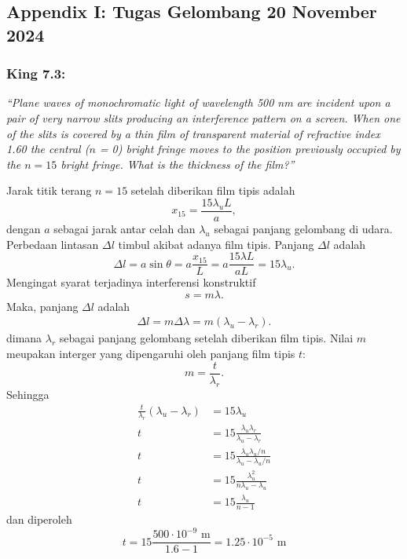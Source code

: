 \documentclass[../../../main.tex]{subfiles}
\begin{document}
\subsection*{Appendix I: Tugas Gelombang 20 November 2024}
\subsubsection*{King 7.3:} \emph{\enquote{Plane waves of monochromatic light of wavelength 500 nm are incident upon a pair of very narrow slits producing an interference pattern on a screen. When one of the slits is covered by a thin ﬁlm of transparent material of refractive index 1.60 the central ($n$ = 0) bright fringe moves to the position previously occupied by the $n = 15$ bright fringe. What is the thickness of the ﬁlm?}}

Jarak titik terang $n=15$ setelah diberikan film tipis adalah
\begin{equation*}
  x_{15}=\frac{15\lambda_u L}{a},
\end{equation*}
dengan $a$ sebagai jarak antar celah dan $\lambda_u$ sebagai panjang gelombang di udara. Perbedaan lintasan $\Delta l$ timbul akibat adanya film tipis. Panjang $\Delta l$ adalah 
\begin{equation*}
  \Delta l=a\sin\theta=a\frac{x_{15}}{L}=a\frac{15\lambda L}{aL}=15\lambda_u.
\end{equation*}
Mengingat syarat terjadinya interferensi konstruktif 
\begin{equation*}
  s=m\lambda.
\end{equation*}
Maka, panjang $\Delta l$ adalah 
\begin{align*}
  \Delta l=m\Delta \lambda=m( \lambda_u-\lambda_r).
\end{align*}
dimana $\lambda_r$ sebagai panjang gelombang setelah diberikan film tipis. Nilai $m$ meupakan interger yang dipengaruhi oleh panjang film tipis $t$:
\begin{equation*}
  m=\frac{t}{\lambda_r}.
\end{equation*}
Sehingga
\begin{align*}
  \frac{t}{\lambda_r}( \lambda_u-\lambda_r)&=15\lambda_u\\
  t&=15\frac{\lambda_u\lambda_r}{ \lambda_u-\lambda_r}\\
  t&=15\frac{\lambda_u\lambda_u/n}{ \lambda_u-\lambda_u/n}\\
  t&=15\frac{\lambda_u^2}{ n\lambda_u-\lambda_u}\\
  t&=15\frac{\lambda_u}{ n-1}
\end{align*}
dan diperoleh 
\begin{equation*}
  t=15\frac{500\cdot10^{-9} \text{ m}}{ 1.6-1}=\boxed{1.25 \cdot 10^{-5} \text{ m}}
\end{equation*}
\end{document}
